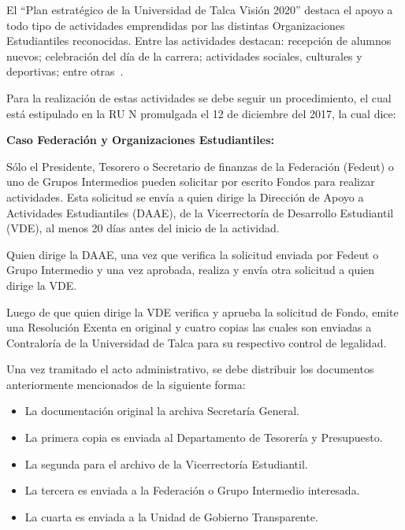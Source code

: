 El ``Plan estratégico de la Universidad de Talca Visión 2020'' destaca el apoyo a todo tipo de actividades emprendidas por las distintas Organizaciones Estudiantiles reconocidas. Entre las actividades destacan: recepción de alumnos nuevos; celebración del día de la carrera; actividades sociales, culturales y deportivas; entre otras~\cite{5}.

Para la realización de estas actividades se debe seguir un procedimiento, el cual está estipulado en la RU N promulgada el 12 de diciembre del 2017, la cual dice:

\begin{tasks}[counter-format = {tsk[A].}]
    \task \textbf{Caso Federación y Organizaciones Estudiantiles:}

    Sólo el Presidente, Tesorero o Secretario de finanzas de la Federación (Fedeut) o uno de Grupos Intermedios pueden solicitar por escrito Fondos para realizar actividades. Esta solicitud se envía a quien dirige la Dirección de Apoyo a Actividades Estudiantiles (DAAE), de la Vicerrectoría de Desarrollo Estudiantil (VDE), al menos 20 días antes del inicio de la actividad. 

    Quien dirige la DAAE, una vez que verifica la solicitud enviada por Fedeut o Grupo Intermedio y una vez aprobada, realiza y envía otra solicitud a quien dirige la VDE.

    Luego de que quien dirige la VDE verifica y aprueba la solicitud de Fondo, emite una Resolución Exenta en original y cuatro copias las cuales son enviadas a Contraloría de la Universidad de Talca para su respectivo control de legalidad. 
    
    Una vez tramitado el acto administrativo, se debe distribuir los documentos anteriormente mencionados de la siguiente forma: 

    \begin{itemize}
        \item La documentación original la archiva Secretaría General.
        \item La primera copia es enviada al Departamento de Tesorería y Presupuesto.
        \item La segunda para el archivo de la Vicerrectoría Estudiantil.
        \item La tercera es enviada a la Federación o Grupo Intermedio interesada.
        \item La cuarta es enviada a la Unidad de Gobierno Transparente.
    \end{itemize}


\end{tasks}
